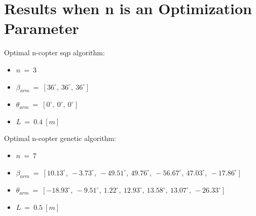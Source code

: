 {\begin{table}[!ht]
  \begin{center}
   \caption{Comparison between all the different optimal designs' hover capabilities.}\vspace{1ex}
   \label{tab:tab_all_compare_hover}
  \end{center}
\end{table}

\section{Results when n is an Optimization Parameter}
\label{sec:result_n}

Optimal n-copter sqp algorithm:

\begin{itemize}
  \item $n\ =\ 3$
  \item $\beta_{arm}\ =\ [36^{\circ},\  36^{\circ},\  36^{\circ}]$
  \item $\theta_{arm}\ =\ [0^{\circ},\  0^{\circ},\  0^{\circ}]$
  \item $L\ =\ 0.4\ [m]$
\end{itemize}

Optimal n-copter genetic algorithm:

\begin{itemize}
  \item $n\ =\ 7$
  \item $\beta_{arm}\ =\ [10.13^{\circ},\  -3.73^{\circ},\  -49.51^{\circ},\  49.76^{\circ},\
                          -56.67^{\circ},\  47.03^{\circ},\  -17.86^{\circ}]$
  \item $\theta_{arm}\ =\ [-18.93^{\circ},\  -9.51^{\circ},\  1.22^{\circ},\  12.93^{\circ},\  13.58^{\circ},\
                            13.07^{\circ},\  -26.33^{\circ}]$
  \item $L\ =\ 0.5\ [m]$
\end{itemize}

}
